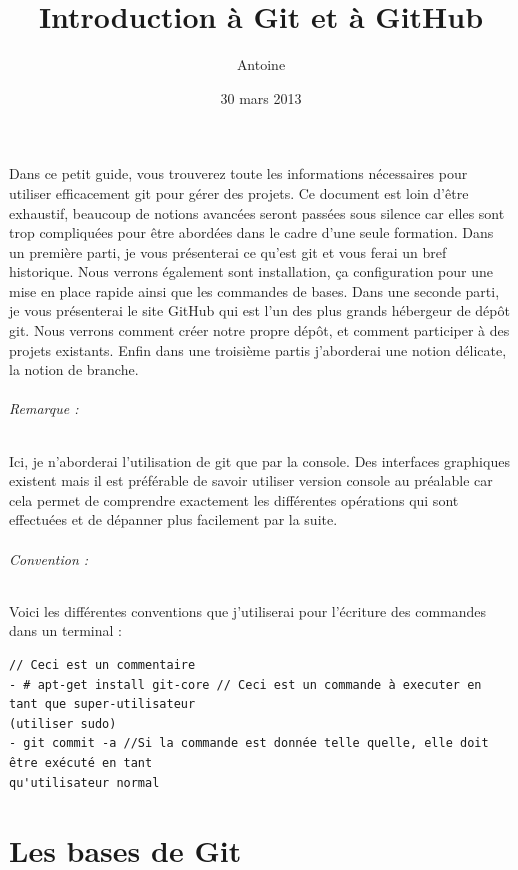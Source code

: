 \documentclass[a4paper]{article}
\title{Introduction à Git et à GitHub}
\author{Antoine \bsc{Wacheux}}
\date{30 mars 2013}
\begin{document}
\maketitle

Dans ce petit guide, vous trouverez toute les informations nécessaires pour utiliser efficacement git pour gérer des projets. Ce document est loin d'être exhaustif, beaucoup de notions avancées seront passées sous silence car elles sont trop compliquées pour être abordées dans le cadre d'une seule formation. Dans un première parti, je vous présenterai ce qu'est git et vous ferai un bref historique. Nous verrons également sont installation, ça configuration pour une mise en place rapide ainsi que les commandes de bases. Dans une seconde parti, je vous présenterai le site GitHub qui est l'un des plus grands hébergeur de dépôt git. Nous verrons comment créer notre propre dépôt, et comment participer à des projets existants. Enfin dans une troisième partis j'aborderai une notion délicate, la notion de branche. 

\paragraph{Remarque :} Ici, je n'aborderai l'utilisation de git que par la console. Des interfaces graphiques existent mais il est préférable de savoir utiliser version console au préalable car cela permet de comprendre exactement les différentes opérations qui sont effectuées et de dépanner plus facilement par la suite. 

\paragraph{Convention :} Voici les différentes conventions que j'utiliserai pour l'écriture des commandes dans un terminal : 

\begin{verbatim}
// Ceci est un commentaire
- # apt-get install git-core // Ceci est un commande à executer en tant que super-utilisateur 
(utiliser sudo)
- git commit -a //Si la commande est donnée telle quelle, elle doit être exécuté en tant 
qu'utilisateur normal
\end{verbatim}

\tableofcontents

\part{Les bases de Git}
\end{document}
